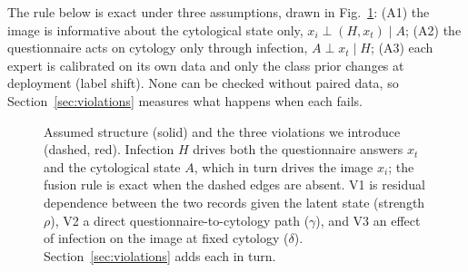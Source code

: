 \documentclass[lettersize,journal]{IEEEtran}
\begin{document}
The rule below is exact under three assumptions, drawn in Fig.~\ref{fig:dag}: (A1) the image is informative about the cytological state only, $x_i\perp(H,x_t)\mid A$; (A2) the questionnaire acts on cytology only through infection, $A\perp x_t\mid H$; (A3) each expert is calibrated on its own data and only the class prior changes at deployment (label shift). None can be checked without paired data, so Section~\ref{sec:violations} measures what happens when each fails.

\begin{figure}[t]
\centering
{}
\caption{Assumed structure (solid) and the three violations we introduce (dashed, red). Infection $H$ drives both the questionnaire answers $x_t$ and the cytological state $A$, which in turn drives the image $x_i$; the fusion rule is exact when the dashed edges are absent. V1 is residual dependence between the two records given the latent state (strength $\rho$), V2 a direct questionnaire-to-cytology path ($\gamma$), and V3 an effect of infection on the image at fixed cytology ($\delta$). Section~\ref{sec:violations} adds each in turn.}
\label{fig:dag}
\end{figure}
\end{document}
